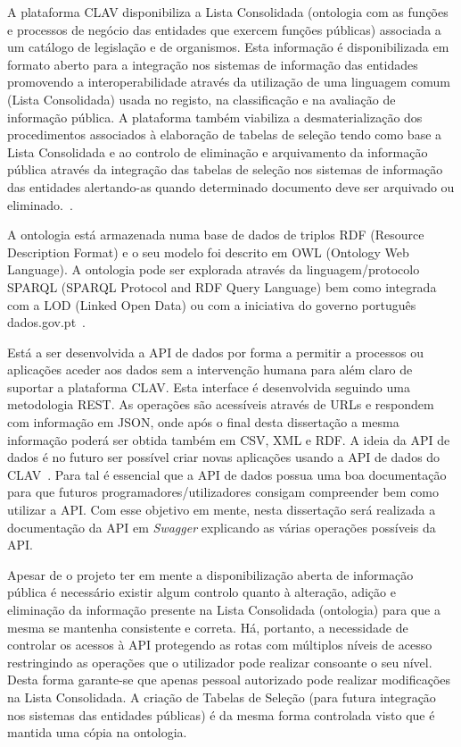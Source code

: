 \documentclass{article}
\begin{document}
A plataforma CLAV disponibiliza a Lista Consolidada (ontologia com as funções e processos de negócio das entidades que exercem funções públicas) associada a um catálogo de legislação e de organismos. Esta informação é disponibilizada em formato aberto para a integração nos sistemas de informação das entidades promovendo a interoperabilidade através da utilização de uma linguagem comum (Lista Consolidada) usada no registo, na classificação e na avaliação de informação pública. A plataforma também viabiliza a desmaterialização dos procedimentos associados à elaboração de tabelas de seleção tendo como base a Lista Consolidada e ao controlo de eliminação e arquivamento da informação pública através da integração das tabelas de seleção nos sistemas de informação das entidades alertando-as quando determinado documento deve ser arquivado ou eliminado.~\cite{clav2}.

A ontologia está armazenada numa base de dados de triplos RDF (Resource Description Format) e o seu modelo foi descrito em OWL (Ontology Web Language). A ontologia pode ser explorada através da linguagem/protocolo SPARQL (SPARQL Protocol and RDF Query Language) bem como integrada com a LOD (Linked Open Data) ou com a iniciativa do governo português dados.gov.pt~\cite{clav3}. 

Está a ser desenvolvida a API de dados por forma a permitir a processos ou aplicações aceder aos dados sem a intervenção humana para além claro de suportar a plataforma CLAV. Esta interface é desenvolvida seguindo uma metodologia REST. As operações são acessíveis através de URLs e respondem com informação em JSON, onde após o final desta dissertação a mesma informação poderá ser obtida também em CSV, XML e RDF. A ideia da API de dados é no futuro ser possível criar novas aplicações usando a API de dados do CLAV~\cite{clav3}. Para tal é essencial que a API de dados possua uma boa documentação para que futuros programadores/utilizadores consigam compreender bem como utilizar a API. Com esse objetivo em mente, nesta dissertação será realizada a documentação da API em \textit{Swagger} explicando as várias operações possíveis da API.

Apesar de o projeto ter em mente a disponibilização aberta de informação pública é necessário existir algum controlo quanto à alteração, adição e eliminação da informação presente na Lista Consolidada (ontologia) para que a mesma se mantenha consistente e correta. Há, portanto, a necessidade de controlar os acessos à API protegendo as rotas com múltiplos níveis de acesso restringindo as operações que o utilizador pode realizar consoante o seu nível. Desta forma garante-se que apenas pessoal autorizado pode realizar modificações na Lista Consolidada. A criação de Tabelas de Seleção (para futura integração nos sistemas das entidades públicas) é da mesma forma controlada visto que é mantida uma cópia na ontologia.
\end{document}
